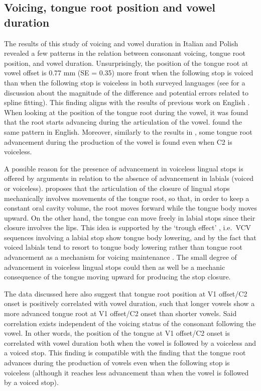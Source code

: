 \documentclass[preprint]{JASAnew}
\begin{document}
\label{s:discussion}

\hypertarget{voicing-tongue-root-position-and-vowel-duration}{%
\subsection{Voicing, tongue root position and vowel
duration}\label{voicing-tongue-root-position-and-vowel-duration}}

The results of this study of voicing and vowel duration in Italian and
Polish revealed a few patterns in the relation between consonant
voicing, tongue root position, and vowel duration. Unsurprisingly, the
position of the tongue root at vowel offset is 0.77 mm (SE = 0.35) more
front when the following stop is voiced than when the following stop is
voiceless in both surveyed languages (see  for a
discussion about the magnitude of the difference and potential errors
related to spline fitting). This finding aligns with the results of
previous work on English
\citep{kent1969, perkell1969, westbury1983, ahn2018}. When looking at
the position of the tongue root during the vowel, it was found that the
root starts advancing during the articulation of the vowel.
\citet{westbury1983} found the same pattern in English. Moreover,
similarly to the results in \citet{westbury1983}, some tongue root
advancement during the production of the vowel is found even when C2 is
voiceless.

A possible reason for the presence of advancement in voiceless lingual
stops is offered by arguments in relation to the absence of advancement
in labials (voiced or voiceless). \citet{westbury1983} proposes that the
articulation of the closure of lingual stops mechanically involves
movements of the tongue root, so that, in order to keep a constant oral
cavity volume, the root moves forward while the tongue body moves
upward. On the other hand, the tongue can move freely in labial stops
since their closure involves the lips. This idea is supported by the
`trough effect' \citep{vazquez-alvarez2007}, i.e.~VCV sequences
involving a labial stop show tongue body lowering, and by the fact that
voiced labials tend to resort to tongue body lowering rather than tongue
root advancement as a mechanism for voicing maintenance
\citep{perkell1969, westbury1983, ahn2018}. The small degree of
advancement in voiceless lingual stops could then as well be a mechanic
consequence of the tongue moving upward for producing the stop closure.

The data discussed here also suggest that tongue root position at V1
offset/C2 onset is positively correlated with vowel duration, such that
longer vowels show a more advanced tongue root at V1 offset/C2 onset
than shorter vowels. Said correlation exists independent of the voicing
status of the consonant following the vowel. In other words, the
position of the tongue at V1 offset/C2 onset is correlated with vowel
duration both when the vowel is followed by a voiceless and a voiced
stop. This finding is compatible with the finding that the tongue root
advances during the production of vowels even when the following stop is
voiceless (although it reaches less advancement than when the vowel is
followed by a voiced stop).
\end{document}
